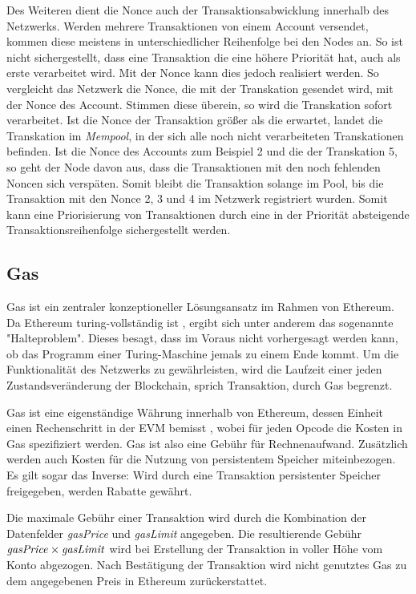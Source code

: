 \documentclass[runningheads]{llncs}
\begin{document}
Des Weiteren dient die Nonce auch der Transaktionsabwicklung innerhalb des Netzwerks.  Werden mehrere Transaktionen von einem Account versendet, kommen diese meistens in unterschiedlicher Reihenfolge bei den Nodes an. So ist nicht sichergestellt, dass eine Transaktion die eine höhere Priorität hat, auch als erste verarbeitet wird. Mit der Nonce kann dies jedoch realisiert werden. So vergleicht das Netzwerk die Nonce, die mit der Transkation gesendet wird, mit der Nonce des Account. Stimmen diese überein, so wird die Transkation sofort verarbeitet. Ist die Nonce der Transaktion größer als die erwartet, landet die Transkation im \textit{Mempool}, in der sich alle noch nicht verarbeiteten Transkationen befinden. Ist die Nonce des Accounts zum Beispiel 2 und die der Transkation 5, so geht der Node davon aus, dass die Transaktionen mit den noch fehlenden Noncen sich verspäten. Somit bleibt die Transaktion solange im Pool, bis die Transaktion mit den Nonce 2, 3 und 4 im Netzwerk registriert wurden. Somit kann eine Priorisierung von Transaktionen durch eine in der Priorität absteigende Transaktionsreihenfolge sichergestellt werden.



\subsection{Gas}
\label{gas}
Gas ist ein zentraler konzeptioneller Lösungsansatz im Rahmen von Ethereum. Da Ethereum turing-vollständig ist \cite[S. 1]{wood_ethereum/yellowpaper_2019}, ergibt sich unter anderem das sogenannte "Halteproblem". Dieses besagt, dass im Voraus nicht vorhergesagt werden kann, ob das Programm einer Turing-Maschine jemals zu einem Ende kommt. \cite[S.70]{davis_computability_2013} Um die Funktionalität des Netzwerks zu gewährleisten, wird die Laufzeit einer jeden Zustandsveränderung der Blockchain, sprich Transaktion, durch Gas begrenzt.

Gas ist eine eigenständige Währung innerhalb von Ethereum, dessen Einheit einen Rechenschritt in der EVM bemisst \cite[S. 9:3]{m.spain_oasics-tokeneconomics_2019}, wobei für jeden Opcode die Kosten in Gas spezifiziert werden. \cite[S. 25 ff.]{wood_ethereum/yellowpaper_2019} Gas ist also eine Gebühr für Rechnenaufwand. Zusätzlich werden auch Kosten für die Nutzung von persistentem Speicher miteinbezogen. Es gilt sogar das Inverse: Wird durch eine Transaktion persistenter Speicher freigegeben, werden Rabatte gewährt.

Die maximale Gebühr einer Transaktion wird durch die Kombination der Datenfelder \textit{gasPrice} und \textit{gasLimit} angegeben. Die resultierende Gebühr $ \text{\textit{gasPrice}} \times \text{\textit{gasLimit}} $ wird bei Erstellung der Transaktion in voller Höhe vom Konto abgezogen. Nach Bestätigung der Transaktion wird nicht genutztes Gas zu dem angegebenen Preis in Ethereum zurückerstattet.
\end{document}
